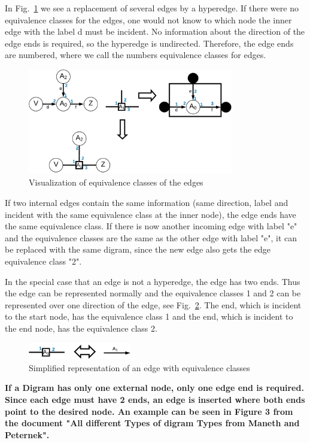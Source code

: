 \documentclass[a4paper]{scrartcl}
\newcommand{\asd}[1]{\textbf{#1}}
\begin{document}
In Fig.~\ref{fig:edgeEC} we see a replacement of several edges by a hyperedge. If there were no equivalence classes for the edges, one would not know to which node the inner edge with the label d must be incident. No information about the direction of the edge ends is required, so the hyperedge is undirected. Therefore, the edge ends are numbered, where we call the numbers equivalence classes for edges.
\begin{figure}[h]
	\centering
	\includegraphics[width=0.8\textwidth]{img/edgeEC}
	\caption{Visualization of equivalence classes of the edges}
	\label{fig:edgeEC}
\end{figure}

If two internal edges contain the same information (same direction, label and incident with the same equivalence class at the inner node), the edge ends have the same equivalence class. If there is now another incoming edge with label "e" and the equivalence classes are the same as the other edge with label "e", it can be replaced with the same digram, since the new edge also gets the edge equivalence class "2".


In the special case that an edge is not a hyperedge, the edge has two ends. Thus the edge can be represented normally and the equivalence classes 1 and 2 can be represented over one direction of the edge, see Fig.~\ref{fig:edgeECsimple}. The end, which is incident to the start node, has the equivalence class 1 and the end, which is incident to the end node, has the equivalence class 2.
\begin{figure}[h]
	\centering
	\includegraphics[width=0.4\textwidth]{img/edgeEC_simple}
	\caption{Simplified representation of an edge with equivalence classes}
	\label{fig:edgeECsimple}
\end{figure}


\asd{If a Digram has only one external node, only one edge end is required. Since each edge must have 2 ends, an edge is inserted where both ends point to the desired node. An example can be seen in Figure 3 from the document "All different Types of digram Types from Maneth and Peternek".}
\end{document}
